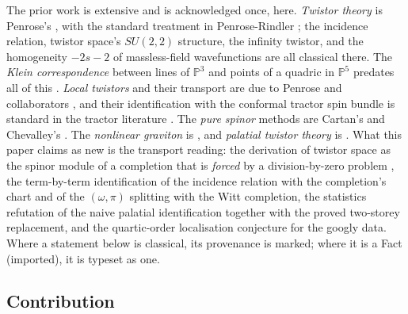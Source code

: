 \documentclass[11pt]{article}
\theoremstyle{definition}
\begin{document}
The prior work is extensive and is acknowledged once, here. \emph{Twistor theory} is Penrose's \cite{Penrose1967}, with the standard treatment in Penrose-Rindler \cite{PenroseRindler86}; the incidence relation, twistor space's $SU(2,2)$ structure, the infinity twistor, and the homogeneity $-2s-2$ of massless-field wavefunctions are all classical there. The \emph{Klein correspondence} between lines of $\mathbb{P}^3$ and points of a quadric in $\mathbb{P}^5$ predates all of this \cite{Klein1870}. \emph{Local twistors} and their transport are due to Penrose and collaborators \cite{PenroseMacCallum73, Dighton74}, and their identification with the conformal tractor spin bundle is standard in the tractor literature \cite{BEG1994, CurryGover2018}. The \emph{pure spinor} methods are Cartan's and Chevalley's \cite{Chevalley54}. The \emph{nonlinear graviton} is \cite{Penrose76}, and \emph{palatial twistor theory} is \cite{Penrose15}. What this paper claims as new is the transport reading: the derivation of twistor space as the spinor module of a completion that is \emph{forced} by a division-by-zero problem \cite{ButlerT1}, the term-by-term identification of the incidence relation with the completion's chart and of the $(\omega, \pi)$ splitting with the Witt completion, the statistics refutation of the naive palatial identification together with the proved two-storey replacement, and the quartic-order localisation conjecture for the googly data. Where a statement below is classical, its provenance is marked; where it is a Fact (imported), it is typeset as one.

\subsection*{Contribution}
\end{document}
